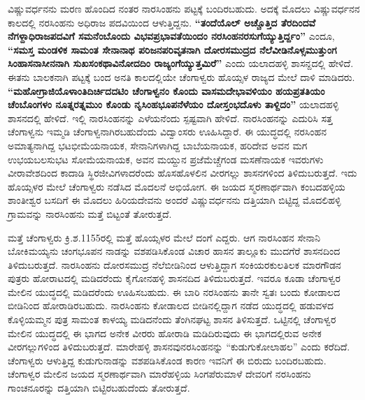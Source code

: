 ವಿಷ್ಣುವರ್ಧನನು ಮರಣ ಹೊಂದಿದ ನಂತರ ನಾರಸಿಂಹನು ಪಟ್ಟಕ್ಕೆ ಬಂದಿರಬಹುದು. ಅದಕ್ಕೆ ಮೊದಲು ವಿಷ್ಣುವರ್ಧನನ ಕಾಲದಲ್ಲಿ ನರಸಿಂಹನು ಅಧಿರಾಜ ಪದವಿಯಿಂದ ಆಳುತ್ತಿದ್ದನು. \textbf{“ತಂದೆಯೊಲ್​ ಅಚ್ಚೊತ್ತಿದ ತೆರದಿಂದವೆ ನೆಗಳ್ದಾಧಿರಾಜಪದವಿಗೆ ಸಮನೆಂಬೊಂದು ವಿಭವಪ್ರಭಾವತೆಯಿಂದಂ ನರಸಿಂಹನರಸುಗೆಯ್ಯುತ್ತಿರ್ದ್ದಂ”} ಎಂದೂ, \textbf{“ಸಮಸ್ತ ಮಂಡಳಿಕ ಸಾಮಂತ ಸೇನಾನಾಥ ಪರಿಜನಪರಿವೃತನಾಗಿ ದೋರಸಮುದ್ರದ ನೆಲೆವೀಡಿನೊಳ್ಸಮುತ್ತುಂಗ ಸಿಂಹಾಸನಾಸೀನನಾಗಿ ಸುಖಸಂಕಥಾವಿನೋದದಿಂ ರಾಜ್ಯಂಗೆಯ್ಯುತ್ತಮಿರೆ”} ಎಂದು ಯಲಾದಹಳ್ಳಿ ಶಾಸನ್ದದಲ್ಲಿ ಹೇಳಿದೆ. ಈತನು ಬಾಲಕನಾಗಿ ಪಟ್ಟಕ್ಕೆ ಬಂದ ಅನತಿ ಕಾಲದಲ್ಲಿಯೇ ಚೆಂಗಾಳ್ವರು ಹೊಯ್ಸಳ ರಾಜ್ಯದ ಮೇಲೆ ದಾಳಿ ಮಾಡಿದರು. \textbf{“ಮಹೋಗ್ರಾಜಿಯೊಳಾಂತಿದಿರ್ಚಿ\-ದದಟಿಂ ಚೆಂಗಾಳ್ವನಂ ಕೊಂದು ವಾಸಮದೇಭಾವಳಿಯಂ ಹಯಪ್ರತತಿಯಂ ಚೆಂಬೊಂಗಳಂ ನೂತ್ನರತ್ನಮುಂ ಕೊಂಡು\general{\break } ನೃಸಿಂಹಭೂಪನೆಳೆಯಂ ದೋಸ್ತಂಭದೊಳು ತಾಳ್ದಿದಂ”} ಯಲಾದಹಳ್ಳಿ ಶಾಸನದಲ್ಲಿ ಹೇಳಿದೆ. ಇಲ್ಲಿ ನಾರಸಿಂಹನನ್ನು ಎಳೆಯನೆಂದು ಸ್ಪಷ್ಟವಾಗಿ ಹೇಳಿದೆ. ನಾರಸಿಂಹನನ್ನು ಎದುರಿಸಿ ಸತ್ತ ಚೆಂಗಾಳ್ವನು ಇಮ್ಮಡಿ ಚೆಂಗಾಳ್ವನಾಗಿರಬಹುದೆಂದು ವಿದ್ವಾಂಸರು ಊಹಿಸಿದ್ದಾರೆ. ಈ ಯುದ್ಧದಲ್ಲಿ ನರಸಿಂಹನ ಅಮಾತ್ಯನಾಗಿದ್ದ ಭಟಭೀಮೆಯನಾಯಕ, ಸೇನಾನಿಗಳಾಗಿದ್ದ ಬಾಬೆಯನಾಯಕ, ಹರಿದೇವ ಅವನ ಮಗ ಉಭಯಬಲಸುಭಟ ಸೋಮೆಯನಾಯಕ, ಅವನ ಮಯ್ದುನ ಪ್ರಜೆಮೆಚ್ಚೆಗಂಡ ಮಸಣೆನಾಯಕ ಇವರುಗಳು ವೀರಾವೇಶದಿಂದ ಕಾದಾಡಿ ಸ್ಥಿರಜೀವಿಗಳಾದರೆಂದು ಹೊಸಹೊಳಲಿನ ವೀರಗಲ್ಲು ಶಾಸನಗಳಿಂದ ತಿಳಿದುಬರುತ್ತದೆ. ಇದು ಹೊಯ್ಸಳರ ಮೇಲೆ ಚೆಂಗಾಳ್ವರು ನಡೆಸಿದ ಮೊದಲನೆ ಅಭಿಯೋಗ. ಈ ಜಯದ ಸ್ಮರಣಾರ್ಥವಾಗಿ ಕಂಬದಹಳ್ಳಿಯ ಶಾಂತೀಶ್ವರ ಬಸದಿಗೆ ಈ ಮೊದಲು ಹಿರಿಯದೇವನು ಅಂದರೆ ವಿಷ್ಣುವರ್ಧನನು ದತ್ತಿಯಾಗಿ ಬಿಟ್ಟಿದ್ದ ಮೊದಲಿಹಳ್ಳಿ ಗ್ರಾಮವನ್ನು ನಾರಸಿಂಹನು ಮತ್ತೆ ಬಿಟ್ಟಂತೆ ತೋರುತ್ತದೆ.

ಮತ್ತೆ ಚೆಂಗಾಳ್ವರು ಕ್ರಿ.ಶ.1155ರಲ್ಲಿ ಮತ್ತೆ ಹೊಯ್ಸಳರ ಮೇಲೆ ದಂಗೆ ಎದ್ದರು. ಆಗ ನಾರಸಿಂಹನ ಸೇನಾನಿ ಬೋಕಿಮಯ್ಯನು ಚಂಗಭೂಪನ ನಾಡನ್ನು ವಶಪಡಿಸಿಕೊಂಡ ವಿಚಾರ ಹಾಸನ ತಾಲ್ಲೂಕು ಮುದಗೆರೆ ಶಾಸನದಿಂದ ತಿಳಿದುಬರುತ್ತದೆ. ನಾರಸಿಂಹನು ದೋರಸಮುದ್ರ ನೆಲೆಬೀಡಿನಿಂದ ಆಳುತ್ತಿದ್ದಾಗ ಸಂಕಿಯರಕುಲತಿಲಕ ಮಾರಗೌಡನ ಪುತ್ರರು ಹೋರಾಟದಲ್ಲಿ ಮಡಿದರೆಂದು ಕೈಗೋನಹಳ್ಳಿ ಶಾಸನದಿದ ತಿಳಿದುಬರುತ್ತದೆ. ಇವರೂ ಕೂಡಾ ಚೆಂಗಾಳ್ವರ ಮೇಲಿನ ಯುದ್ಧದಲ್ಲಿ ಮಡಿದರೆಂದು ಊಹಿಸಬಹುದು. ಈ ಬಾರಿ ನರಸಿಂಹನು ತಾನೇ ಸ್ವತಃ ಬಂದು ಕೋಡಾಲದ ಬೀಡಿನಿಂದ ಹೋರಾಡಿರಬಹುದು. ನಾರಸಿಂಹನು ಕೋಡಾಲದ ಬೀಡಿನಲ್ಲಿದ್ದಾಗ ನಡೆದ ಯುದ್ಧದಲ್ಲಿ ಹಡುವಳದ ಕೊಳ್ಳಿಯಮ್ಮನ ಪುತ್ರ ಸಾಮಂತ ಕಾಳಯ್ಯ ಮಡಿದನೆಂದು ತೆಂಗಿನಘಟ್ಟ ಶಾಸನ ತಿಳಿಸುತ್ತದೆ. ಒಟ್ಟಿನಲ್ಲಿ ಚೆಂಗಾಳ್ವರ ಮೇಲಿನ ಯುದ್ಧದಲ್ಲಿ ಈ ಭಾಗದ ಅನೇಕ ವೀರರು ಹೋರಾಡಿ ಮಡಿದಿರುವುದು ಈ ಭಾಗದಲ್ಲಿರುವ ಅನೇಕ ವೀರಗಲ್ಲುಗಳಿಂದ ತಿಳಿದುಬರುತ್ತದೆ. ಮಾರೇಹಳ್ಳಿ ಶಾಸನವುನರಸಿಂಹನನ್ನು “ಕುಡುಗುಕೋಲಾಹಲ” ಎಂದು ಕರೆದಿದೆ. ಚೆಂಗಾಳ್ವರು ಆಳುತ್ತಿದ್ದ ಕುಡುಗುನಾಡನ್ನು ವಶಪಡಿಸಿಕೊಂಡ ಕಾರಣ ಇವನಿಗೆ ಈ ಬಿರುದು ಬಂದಿರಬಹುದು. ಚೆಂಗಾಳ್ವರ ಮೇಲಿನ ಜಯದ ಸ್ಮರಣಾರ್ಥವಾಗಿ ಮಾರೆಹಳ್ಳಿಯ ಸಿಂಗಪೆರುಮಾಳೆ ದೇವರಿಗೆ ನರಸಿಂಹನು ಗಾಂಚನೂರನ್ನು ದತ್ತಿಯಾಗಿ ಬಿಟ್ಟಿರಬಹುದೆಂದು ತೋರುತ್ತದೆ.

